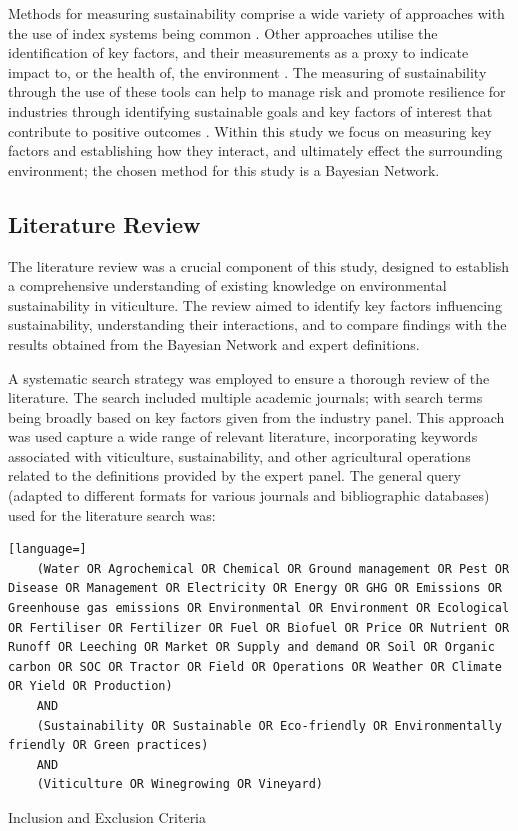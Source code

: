 Methods for measuring sustainability comprise a wide variety of approaches with the use of index systems being common \citep{gehringerMappingSustainabilityMeasurement2024}. Other approaches utilise the identification of key factors, and their measurements as a proxy to indicate impact to, or the health of, the environment \citep{floresWhatSustainabilityWine2018}. The measuring of sustainability through the use of these tools can help to manage risk and promote resilience for industries through identifying sustainable goals and key factors of interest that contribute to positive outcomes \citep{klemesAssessingMeasuringEnvironmental2015, beckerSustainabilityScienceManaging2024}. Within this study we focus on measuring key factors and establishing how they interact, and ultimately effect the surrounding environment; the chosen method for this study is a Bayesian Network.

\subsection{Literature Review}

The literature review was a crucial component of this study, designed to establish a comprehensive understanding of existing knowledge on environmental sustainability in viticulture. The review aimed to identify key factors influencing sustainability, understanding their interactions, and to compare findings with the results obtained from the Bayesian Network and expert definitions.

A systematic search strategy was employed to ensure a thorough review of the literature. The search included multiple academic journals; with search terms being broadly based on key factors given from the industry panel. This approach was used capture a wide range of relevant literature, incorporating keywords associated with viticulture, sustainability, and other agricultural operations related to the definitions provided by the expert panel. The general query (adapted to different formats for various journals and bibliographic databases) used for the literature search was: 

\begin{lstlisting}[language=]
    (Water OR Agrochemical OR Chemical OR Ground management OR Pest OR Disease OR Management OR Electricity OR Energy OR GHG OR Emissions OR Greenhouse gas emissions OR Environmental OR Environment OR Ecological OR Fertiliser OR Fertilizer OR Fuel OR Biofuel OR Price OR Nutrient OR Runoff OR Leeching OR Market OR Supply and demand OR Soil OR Organic carbon OR SOC OR Tractor OR Field OR Operations OR Weather OR Climate OR Yield OR Production)
    AND
    (Sustainability OR Sustainable OR Eco-friendly OR Environmentally friendly OR Green practices)
    AND
    (Viticulture OR Winegrowing OR Vineyard)
    \end{lstlisting}
Inclusion and Exclusion Criteria

